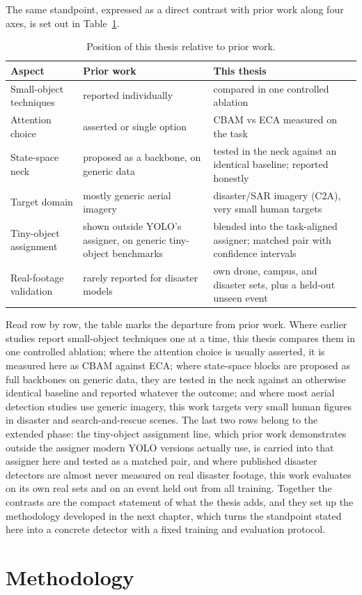 \documentclass[12pt,a4paper,oneside]{report}
\begin{document}
The same standpoint, expressed as a direct contrast with prior work along four
axes, is set out in Table~\ref{tab:gap}.

\begin{table}[tbp]
  \centering
  \caption{Position of this thesis relative to prior work.}
  \label{tab:gap}
  \small
  \setlength{\tabcolsep}{5pt}
  \begin{tabular}{|p{3.8cm}|p{4.7cm}|p{4.7cm}|}
    \hline
    Aspect & Prior work & This thesis \\
    \hline
    Small-object techniques & reported individually & compared in one controlled ablation \\ \hline
    Attention choice & asserted or single option & CBAM vs ECA measured on the task \\ \hline
    State-space neck & proposed as a backbone, on generic data & tested in the neck against an identical baseline; reported honestly \\ \hline
    Target domain & mostly generic aerial imagery & disaster/SAR imagery (C2A), very small human targets \\ \hline
    Tiny-object assignment & shown outside YOLO's assigner, on generic tiny-object benchmarks & blended into the task-aligned assigner; matched pair with confidence intervals \\ \hline
    Real-footage validation & rarely reported for disaster models & own drone, campus, and disaster sets, plus a held-out unseen event \\
    \hline
  \end{tabular}
\end{table}

Read row by row, the table marks the departure from prior work. Where earlier
studies report small-object techniques one at a time, this thesis compares them
in one controlled ablation; where the attention choice is usually asserted, it
is measured here as CBAM against ECA; where state-space blocks are proposed as
full backbones on generic data, they are tested in the neck against an
otherwise identical baseline and reported whatever the outcome; and where most
aerial detection studies use generic imagery, this work targets very small
human figures in disaster and search-and-rescue scenes. The last two rows
belong to the extended phase: the tiny-object assignment line, which prior
work demonstrates outside the assigner modern YOLO versions actually use, is
carried into that assigner here and tested as a matched pair, and where
published disaster detectors are almost never measured on real disaster
footage, this work evaluates on its own real sets and on an event held out
from all training. Together the contrasts are the compact statement of what
the thesis adds, and they set up the methodology developed in the next
chapter, which turns the standpoint stated here into a concrete detector with
a fixed training and evaluation protocol.
 \newpage 
 \newpage \chapter{Methodology}
\end{document}
